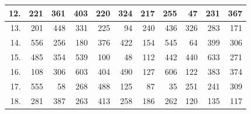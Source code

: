 \begin{table}[H]
{\begin{tabular}{|r|r|r|r|r|r|r|r|r|r|r|}
12.                    & 221                            & 361                             & 403                              & 220                              & 324                              & 217                              & 255                              & 47                               & 231                              & 367                              \\ \hline
13.                    & 201                            & 448                             & 331                              & 225                              & 94                               & 240                              & 436                              & 326                              & 283                              & 171                              \\ \hline
14.                    & 556                            & 256                             & 180                              & 376                              & 422                              & 154                              & 545                              & 64                               & 399                              & 306                              \\ \hline
15.                    & 485                            & 354                             & 539                              & 100                              & 48                               & 112                              & 442                              & 440                              & 633                              & 271                              \\ \hline
16.                    & 108                            & 306                             & 603                              & 404                              & 490                              & 127                              & 606                              & 122                              & 383                              & 374                              \\ \hline
17.                    & 555                            & 58                              & 268                              & 488                              & 125                              & 87                               & 35                               & 251                              & 241                              & 309                              \\ \hline
18.                    & 281                            & 387                             & 263                              & 413                              & 258                              & 186                              & 262                              & 120                              & 135                              & 117                              \\ \hline

\end{tabular}}
\end{table}
